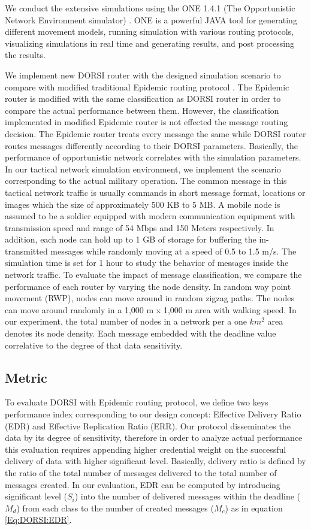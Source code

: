 We conduct the extensive simulations using the ONE 1.4.1 (The Opportunistic Network Environment simulator) \cite{Keranen2009b}. 
ONE is a powerful JAVA tool for generating different movement models, running simulation with various routing protocols, visualizing simulations in real time and generating results, and post processing the results.

We implement new DORSI router with the designed simulation scenario to compare with modified traditional Epidemic routing protocol \cite{Vahdat2000}. 
The Epidemic router is modified with the same classification as DORSI router in order to compare the actual performance between them. 
However, the classification implemented in modified Epidemic router is not effected the message routing decision. 
The Epidemic router treats every message the same while DORSI router routes messages differently according to their DORSI parameters. 
Basically, the performance of opportunistic network correlates with the simulation parameters. 
In our tactical network simulation environment, we implement the scenario corresponding to the actual military operation. 
The common message in this tactical network traffic is usually commands in short message format, locations or images which the size of approximately 500 KB to 5 MB. 
A mobile node is assumed to be a soldier equipped with modern communication equipment with transmission speed and range of 54 Mbps and 150 Meters respectively. 
In addition, each node can hold up to 1 GB of storage for buffering the in-transmitted messages while randomly moving at a speed of 0.5 to 1.5 m/s. 
The simulation time is set for 1 hour to study the behavior of messages inside the network traffic. 
To evaluate the impact of message classification, we compare the performance of each router by varying the node density. 
In random way point movement (RWP), nodes can move around in random zigzag paths. The nodes can move around randomly in a 1,000 m x 1,000 m area with walking speed. 
In our experiment, the total number of nodes in a network per a one $km^2$ area denotes its node density. 
Each message embedded with the deadline value correlative to the degree of that data sensitivity.

\subsection{Metric}
To evaluate DORSI with Epidemic routing protocol, we define two keys performance index corresponding to our design concept: Effective Delivery Ratio (EDR) and Effective Replication Ratio (ERR). 
Our protocol disseminates the data by its degree of sensitivity, therefore in order to analyze actual performance this evaluation requires appending higher credential weight on the successful delivery of data with higher significant level. 
Basically, delivery ratio is defined by the ratio of the total number of messages delivered to the total number of messages created. 
In our evaluation, EDR can be computed by introducing significant level ($S_i$) into the number of delivered messages within the deadline ($M_d$) from each class to the number of created messages ($M_c$) as in equation \ref{Eq:DORSI:EDR}.

